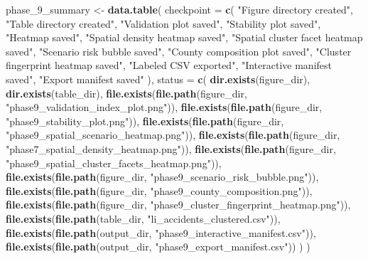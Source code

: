 \documentclass[
]{article}
\newenvironment{Shaded}{\begin{snugshade}}{\end{snugshade}}
\newcommand{\AttributeTok}[1]{\textcolor[rgb]{0.13,0.29,0.53}{#1}}
\newcommand{\FunctionTok}[1]{\textcolor[rgb]{0.13,0.29,0.53}{\textbf{#1}}}
\newcommand{\NormalTok}[1]{#1}
\newcommand{\OtherTok}[1]{\textcolor[rgb]{0.56,0.35,0.01}{#1}}
\newcommand{\StringTok}[1]{\textcolor[rgb]{0.31,0.60,0.02}{#1}}
\begin{document}
\begin{Shaded}
\begin{Highlighting}[]
\NormalTok{phase\_9\_summary }\OtherTok{\textless{}{-}} \FunctionTok{data.table}\NormalTok{(}
  \AttributeTok{checkpoint =} \FunctionTok{c}\NormalTok{(}
    \StringTok{"Figure directory created"}\NormalTok{,}
    \StringTok{"Table directory created"}\NormalTok{,}
    \StringTok{"Validation plot saved"}\NormalTok{,}
    \StringTok{"Stability plot saved"}\NormalTok{,}
    \StringTok{"Heatmap saved"}\NormalTok{,}
    \StringTok{"Spatial density heatmap saved"}\NormalTok{,}
    \StringTok{"Spatial cluster facet heatmap saved"}\NormalTok{,}
    \StringTok{"Scenario risk bubble saved"}\NormalTok{,}
    \StringTok{"County composition plot saved"}\NormalTok{,}
    \StringTok{"Cluster fingerprint heatmap saved"}\NormalTok{,}
    \StringTok{"Labeled CSV exported"}\NormalTok{,}
    \StringTok{"Interactive manifest saved"}\NormalTok{,}
    \StringTok{"Export manifest saved"}
\NormalTok{  ),}
  \AttributeTok{status =} \FunctionTok{c}\NormalTok{(}
    \FunctionTok{dir.exists}\NormalTok{(figure\_dir),}
    \FunctionTok{dir.exists}\NormalTok{(table\_dir),}
    \FunctionTok{file.exists}\NormalTok{(}\FunctionTok{file.path}\NormalTok{(figure\_dir, }\StringTok{"phase9\_validation\_index\_plot.png"}\NormalTok{)),}
    \FunctionTok{file.exists}\NormalTok{(}\FunctionTok{file.path}\NormalTok{(figure\_dir, }\StringTok{"phase9\_stability\_plot.png"}\NormalTok{)),}
    \FunctionTok{file.exists}\NormalTok{(}\FunctionTok{file.path}\NormalTok{(figure\_dir, }\StringTok{"phase9\_spatial\_scenario\_heatmap.png"}\NormalTok{)),}
    \FunctionTok{file.exists}\NormalTok{(}\FunctionTok{file.path}\NormalTok{(figure\_dir, }\StringTok{"phase7\_spatial\_density\_heatmap.png"}\NormalTok{)),}
    \FunctionTok{file.exists}\NormalTok{(}\FunctionTok{file.path}\NormalTok{(figure\_dir, }\StringTok{"phase9\_spatial\_cluster\_facets\_heatmap.png"}\NormalTok{)),}
    \FunctionTok{file.exists}\NormalTok{(}\FunctionTok{file.path}\NormalTok{(figure\_dir, }\StringTok{"phase9\_scenario\_risk\_bubble.png"}\NormalTok{)),}
    \FunctionTok{file.exists}\NormalTok{(}\FunctionTok{file.path}\NormalTok{(figure\_dir, }\StringTok{"phase9\_county\_composition.png"}\NormalTok{)),}
    \FunctionTok{file.exists}\NormalTok{(}\FunctionTok{file.path}\NormalTok{(figure\_dir, }\StringTok{"phase9\_cluster\_fingerprint\_heatmap.png"}\NormalTok{)),}
    \FunctionTok{file.exists}\NormalTok{(}\FunctionTok{file.path}\NormalTok{(table\_dir, }\StringTok{"li\_accidents\_clustered.csv"}\NormalTok{)),}
    \FunctionTok{file.exists}\NormalTok{(}\FunctionTok{file.path}\NormalTok{(output\_dir, }\StringTok{"phase9\_interactive\_manifest.csv"}\NormalTok{)),}
    \FunctionTok{file.exists}\NormalTok{(}\FunctionTok{file.path}\NormalTok{(output\_dir, }\StringTok{"phase9\_export\_manifest.csv"}\NormalTok{))}
\NormalTok{  )}
\NormalTok{)}


\end{Highlighting}
\end{Shaded}
\end{document}
